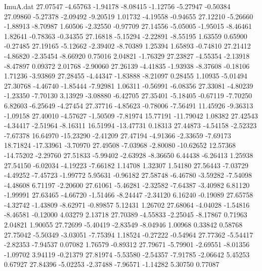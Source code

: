 \begin{filecontents}{ImuA.dat}
  27.07547   -4.65763   -1.94178   -8.08415   -1.12756   -5.27947   -0.50384
  27.09860   -5.27378   -2.09492   -9.20519    1.01732   -4.19558   -0.94655
  27.12210   -5.26660   -1.88913   -8.70987    1.60506   -2.32550   -0.97709
  27.14556   -5.05005   -1.95015   -8.46461    1.82641   -0.78363   -0.34355
  27.16818   -5.15294   -2.22891   -8.55195    1.63559    0.65900   -0.27485
  27.19165   -5.12662   -2.39402   -8.70389    1.25394    1.65893   -0.74810
  27.21412   -4.86820   -2.35454   -8.66920    0.75016    2.04821   -1.76329
  27.23827   -4.55354   -2.13918   -8.47897    0.09372    2.01768   -2.90060
  27.26139   -4.41835   -1.93938   -8.37608   -0.18106    1.71236   -3.93869
  27.28455   -4.44347   -1.83888   -8.21097    0.28455    1.10935   -5.01494
  27.30768   -4.46740   -1.85444   -7.92981    1.06311   -0.56991   -6.08356
  27.33081   -4.80239   -1.23350   -7.70130    3.13929   -3.08880   -6.42705
  27.35401   -5.18405   -0.67119   -7.70250    6.82603   -6.25649   -4.27454
  27.37716   -4.85623   -0.78006   -7.56491   11.45926   -9.36313   -1.09158
  27.40010   -4.57627   -1.50509   -7.81974   15.77191  -11.79042    1.08382
  27.42543   -4.34417   -2.51964   -8.16311   16.51994  -13.47731    0.18313
  27.44873   -4.54158   -2.52323   -7.67378   16.64970  -15.23290   -2.41209
  27.47194   -4.91366   -2.33659   -7.69173   18.71824  -17.33961   -3.70970
  27.49508   -7.03968   -2.80080  -10.62652   12.57368  -14.75202   -2.29760
  27.51833   -5.99402   -2.63928   -8.36650    6.44438   -6.26413    1.25938
  27.54150   -6.02034   -4.19223   -7.66182    1.14708    1.32307    1.54180
  27.56443   -7.03729   -4.49252   -7.45723   -1.99772    5.95631   -0.96182
  27.58748   -6.46780   -3.59282   -7.54098   -4.48608    6.71197   -2.20600
  27.61061   -5.46281   -2.32582   -7.64387   -3.40982    6.81120   -1.99991
  27.63465   -4.66720   -1.51466   -8.24447   -2.34120    6.16240   -0.19089
  27.65758   -4.32742   -1.43809   -8.62971   -0.89857    5.12431    1.26702
  27.68064   -4.04028   -1.54816   -8.46581   -0.12000    4.03279    2.13718
  27.70389   -4.55833   -2.25045   -8.17867    0.71963    2.04821    1.90055
  27.72699   -5.40419   -2.83549   -8.04946    1.00968    0.33842    0.58768
  27.75042   -5.50349   -3.03051   -7.75394    1.18524   -0.27222   -0.54964
  27.77362   -5.54417   -2.82353   -7.94537    0.07082    1.76579   -0.89312
  27.79671   -5.79901   -2.69551   -8.01356   -1.09702    3.94119   -0.21379
  27.81974   -5.53580   -2.54357   -7.91785   -2.06642    5.45253    0.67927
  27.84396   -5.02253   -2.37488   -7.96571   -1.14282    5.30750    0.77087

\end{filecontents}
